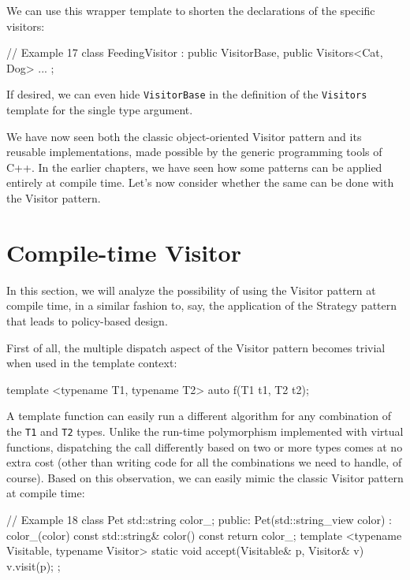 We can use this wrapper template to shorten the declarations of the specific visitors:

\begin{code}
// Example 17
class FeedingVisitor :
  public VisitorBase, public Visitors<Cat, Dog>
{
  ...
};
\end{code}

If desired, we can even hide \texttt{VisitorBase} in the definition of the \texttt{Visitors} template for the single type argument.

We have now seen both the classic object-oriented Visitor pattern and its reusable implementations, made possible by the generic programming tools of C++. In the earlier chapters, we have seen how some patterns can be applied entirely at compile time. Let's now consider whether the same can be done with the Visitor pattern.

\section{Compile-time Visitor}

In this section, we will analyze the possibility of using the Visitor pattern at compile time, in a similar fashion to, say, the application of the Strategy pattern that leads to policy-based design.

First of all, the multiple dispatch aspect of the Visitor pattern becomes trivial when used in the template context:

\begin{code}
template <typename T1, typename T2> auto f(T1 t1, T2 t2);
\end{code}

A template function can easily run a different algorithm for any combination of the \texttt{T1} and \texttt{T2} types. Unlike the run-time polymorphism implemented with virtual functions, dispatching the call differently based on two or more types comes at no extra cost (other than writing code for all the combinations we need to handle, of course). Based on this observation, we can easily mimic the classic Visitor pattern at compile time:

\begin{code}
// Example 18
class Pet {
  std::string color_;
  public:
  Pet(std::string_view color) : color_(color) {}
  const std::string& color() const { return color_; }
  template <typename Visitable, typename Visitor>
  static void accept(Visitable& p, Visitor& v) {
    v.visit(p);
  }
};
\end{code}

